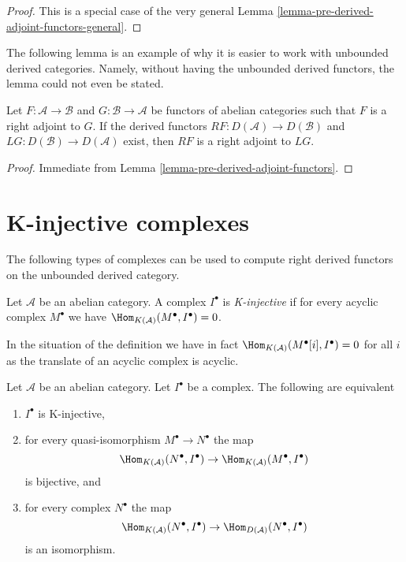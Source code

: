 \begin{proof}
This is a special case of the very general
Lemma \ref{lemma-pre-derived-adjoint-functors-general}.
\end{proof}

\noindent
The following lemma is an example of why it is easier to work
with unbounded derived categories. Namely, without having the
unbounded derived functors, the lemma could not even be stated.

\begin{lemma}
\label{lemma-derived-adjoint-functors}
Let $F : \mathcal{A} \to \mathcal{B}$ and $G : \mathcal{B} \to \mathcal{A}$
be functors of abelian categories such that $F$ is a right adjoint to $G$.
If the derived functors $RF : D(\mathcal{A}) \to D(\mathcal{B})$ and
$LG : D(\mathcal{B}) \to D(\mathcal{A})$ exist, then
$RF$ is a right adjoint to $LG$.
\end{lemma}

\begin{proof}
Immediate from Lemma \ref{lemma-pre-derived-adjoint-functors}.
\end{proof}





\section{K-injective complexes}
\label{section-K-injective}

\noindent
The following types of complexes can be used to compute right derived
functors on the unbounded derived category.

\begin{definition}
\label{definition-K-injective}
Let $\mathcal{A}$ be an abelian category. A complex $I^\bullet$
is {\it K-injective} if for every acyclic complex $M^\bullet$ we
have $\Hom_{K(\mathcal{A})}(M^\bullet, I^\bullet) = 0$.
\end{definition}

\noindent
In the situation of the definition we have in fact
$\Hom_{K(\mathcal{A})}(M^\bullet[i], I^\bullet) = 0$ for all $i$
as the translate of an acyclic complex is acyclic.

\begin{lemma}
\label{lemma-K-injective}
Let $\mathcal{A}$ be an abelian category.
Let $I^\bullet$ be a complex. The following are equivalent
\begin{enumerate}
\item $I^\bullet$ is K-injective,
\item for every quasi-isomorphism $M^\bullet \to N^\bullet$ the map
$$
\Hom_{K(\mathcal{A})}(N^\bullet, I^\bullet)
\to \Hom_{K(\mathcal{A})}(M^\bullet, I^\bullet)
$$
is bijective, and
\item for every complex $N^\bullet$ the map
$$
\Hom_{K(\mathcal{A})}(N^\bullet, I^\bullet)
\to \Hom_{D(\mathcal{A})}(N^\bullet, I^\bullet)
$$
is an isomorphism.
\end{enumerate}
\end{lemma}

